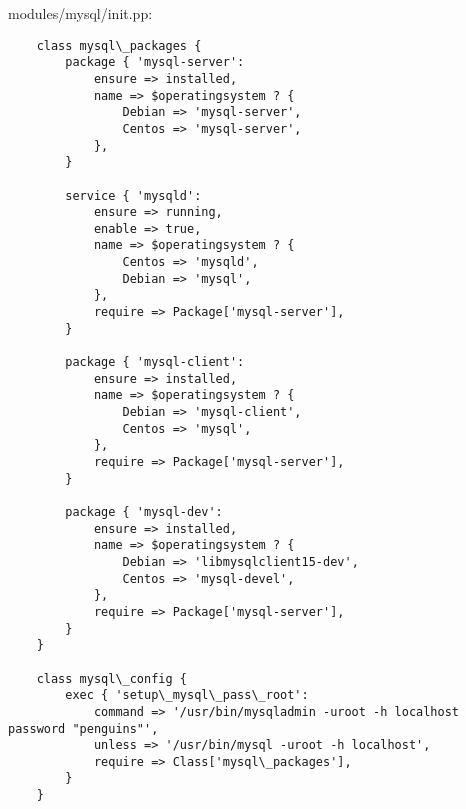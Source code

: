modules/mysql/init.pp:
\begin{verbatim}
	class mysql\_packages {
		package { 'mysql-server':
			ensure => installed,
			name => $operatingsystem ? {
				Debian => 'mysql-server',
				Centos => 'mysql-server',
			},
		}

		service { 'mysqld':
			ensure => running,
			enable => true,
			name => $operatingsystem ? {
				Centos => 'mysqld',
				Debian => 'mysql',
			},
			require => Package['mysql-server'],
		}

		package { 'mysql-client':
			ensure => installed,
			name => $operatingsystem ? {
				Debian => 'mysql-client',
				Centos => 'mysql',
			},
			require => Package['mysql-server'],
		}

		package { 'mysql-dev':
			ensure => installed,
			name => $operatingsystem ? {
				Debian => 'libmysqlclient15-dev',
				Centos => 'mysql-devel',
			},
			require => Package['mysql-server'],
		}
	}

	class mysql\_config {
		exec { 'setup\_mysql\_pass\_root':
			command => '/usr/bin/mysqladmin -uroot -h localhost password "penguins"',
			unless => '/usr/bin/mysql -uroot -h localhost',
			require => Class['mysql\_packages'],
		}
	}
\end{verbatim}

